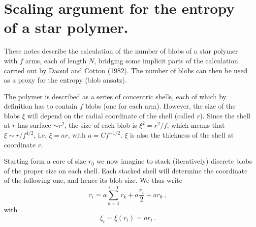 \documentclass[a4paper,12pt,pre,superscriptaddress]{revtex4}
\begin{document}




  


%

\section{Scaling argument for the entropy of a star polymer.}

These notes describe the calculation of the number of blobs of a star
polymer with $f$ arms, each of length $N$, bridging some implicit
parts of the calculation carried out by Daoud and Cotton (1982). The
number of blobs can then be used as a proxy for the entropy (blob
ansatz).

The polymer is described as a series of concentric shells, each of
which by definition has to contain $f$ blobs (one for each
arm). However, the size of the blobs $\xi$ will depend on the radial
coordinate of the shell (called $r$). Since the shell at $r$ has
surface $\sim r^2$, the size of each blob is $\xi^2 = r^2/f$, which
means that $\xi \sim r / f^{1/2}$, i.e. $\xi = a r$, with $a = C
f^{-1/2} $.  $\xi$ is also the thickness of the shell at coordinate
$r$.


Starting form a core of size $r_0$ we now imagine to stack
(iteratively) discrete blobs of the proper size on each shell. Each
stacked shell will determine the coordinate of the following one, and
hence its blob size. We thus write
\begin{displaymath}
  r_i = a \sum_{k=1}^{i-1} r_k + a \frac{r_i}{2} + a r_0 \ ,  
\end{displaymath}
with
\begin{displaymath}
  \xi_i = \xi(r_i) = a r_i \ .
\end{displaymath}
\end{document}
